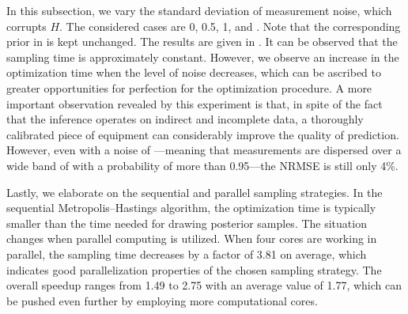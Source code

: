 
In this subsection, we vary the standard deviation of measurement noise, which
corrupts $H$. The considered cases are 0, 0.5, 1, and 
\cite{mesa-martinez2007}. Note that the corresponding prior in
 is kept unchanged. The results are given in
. It can be observed that the sampling time is approximately
constant. However, we observe an increase in the optimization time when the
level of noise decreases, which can be ascribed to greater opportunities for
perfection for the optimization procedure. A more important observation revealed
by this experiment is that, in spite of the fact that the inference operates on
indirect and incomplete data, a thoroughly calibrated piece of equipment can
considerably improve the quality of prediction. However, even with a noise of
---meaning that measurements are dispersed over a wide band of
 with a probability of more than 0.95---the \ac{NRMSE} is still only
4\%.


Lastly, we elaborate on the sequential and parallel sampling strategies. In the
sequential Metropolis--Hastings algorithm, the optimization time is typically
smaller than the time needed for drawing posterior samples. The situation
changes when parallel computing is utilized. When four cores are working in
parallel, the sampling time decreases by a factor of 3.81 on average, which
indicates good parallelization properties of the chosen sampling strategy. The
overall speedup ranges from 1.49 to 2.75 with an average value of 1.77, which
can be pushed even further by employing more computational cores.
